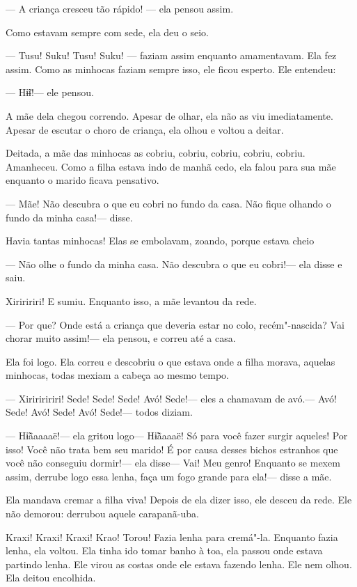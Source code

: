 --- A criança cresceu tão rápido! --- ela pensou assim. 

Como estavam sempre com sede, ela deu o seio. 

--- Tusu! Suku! Tusu! Suku! --- faziam assim enquanto amamentavam. Ela
fez assim. Como as minhocas faziam sempre isso, ele ficou esperto. Ele
entendeu: 

--- Hɨ̃ɨ!--- ele pensou. 

A mãe dela chegou correndo. Apesar de olhar, ela não as viu
imediatamente. Apesar de escutar o choro de criança, ela olhou e voltou
a deitar. 

Deitada, a mãe das minhocas as cobriu, cobriu, cobriu, cobriu, cobriu.
Amanheceu. Como a filha estava indo de manhã cedo, ela falou para sua
mãe enquanto o marido ficava pensativo.

--- Mãe! Não descubra o que eu cobri no fundo da casa. Não fique olhando
o fundo da minha casa!--- disse. 

Havia tantas minhocas! Elas se embolavam, zoando, porque estava cheio 

--- Não olhe o fundo da minha casa. Não descubra o que eu cobri!--- ela
disse e saiu. 

Xiriririri! E sumiu. Enquanto isso, a mãe levantou da rede. 

--- Por que? Onde está a criança que deveria estar no colo,
recém"-nascida? Vai chorar muito assim!--- ela pensou, e correu até a
casa. 

Ela foi logo. Ela correu e descobriu o que estava onde a filha morava,
aquelas minhocas, todas mexiam a cabeça ao mesmo tempo. 

--- Xiririririri! Sede! Sede! Sede! Avó! Sede!--- eles a chamavam de
avó.--- Avó! Sede! Avó! Sede! Avó! Sede!--- todos diziam. 

--- Hɨ̃ãaaaaë!--- ela gritou logo--- Hɨ̃ãaaaë! Só para você fazer surgir
aqueles! Por isso! Você não trata bem seu marido! É por causa desses
bichos estranhos que você não conseguiu dormir!--- ela disse--- Vai! Meu
genro! Enquanto se mexem assim, derrube logo essa lenha, faça um fogo
grande para ela!--- disse a mãe. 

Ela mandava cremar a filha viva! Depois de ela dizer isso, ele desceu da
rede. Ele não demorou: derrubou aquele carapanã-uba.

Kraxi! Kraxi! Kraxi! Krao! Torou! Fazia lenha para cremá"-la. Enquanto
fazia lenha, ela voltou. Ela tinha ido tomar banho à toa, ela passou
onde estava partindo lenha. Ele virou as costas onde ele estava fazendo
lenha. Ele nem olhou. Ela deitou encolhida. 

